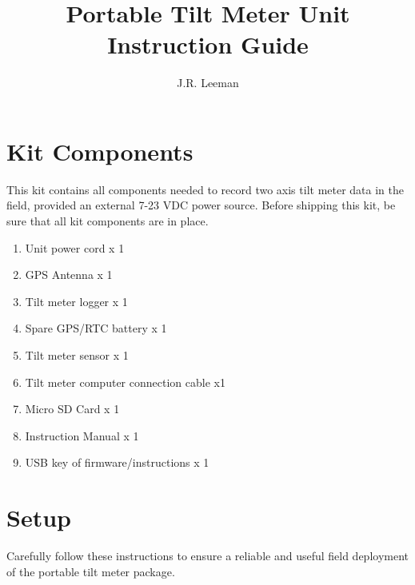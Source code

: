 \documentclass[11pt]{article} %
\title{Portable Tilt Meter Unit Instruction Guide}
\author{J.R. Leeman}
\date{} %
\begin{document}
\maketitle

\section{Kit Components}

This kit contains all components needed to record two axis tilt meter data in the field, provided an external 7-23 VDC power source. Before shipping this kit, be sure that all kit components are in place.

\begin{enumerate}
\item Unit power cord x 1
\item GPS Antenna x 1
\item Tilt meter logger x 1
\item Spare GPS/RTC battery x 1
\item Tilt meter sensor x 1
\item Tilt meter computer connection cable x1
\item Micro SD Card x 1
\item Instruction Manual x 1
\item USB key of firmware/instructions x 1
\end{enumerate}

\section{Setup}
Carefully follow these instructions to ensure a reliable and useful field deployment of the portable tilt meter package. 
\end{document}
